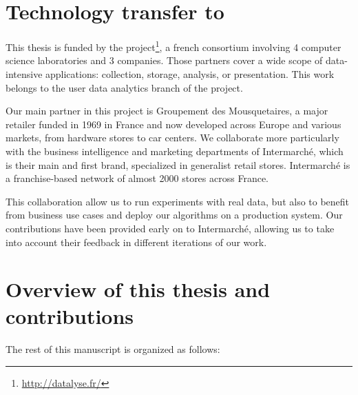 \section{Technology transfer to \datalyse}


This thesis is funded by the \datalyse project\footnote{\url{http://datalyse.fr/}},
a french consortium involving 4 computer science laboratories and 3 companies.
Those partners cover a wide scope of data-intensive applications:
collection, storage, analysis, or presentation.
This work belongs to the user data analytics branch of the project.

Our main partner in this project is Groupement des Mousquetaires,
a major retailer funded in 1969 in France and now developed across Europe and various markets,
from hardware stores to car centers.
We collaborate more particularly with the business intelligence and marketing
departments of Intermarch\'e,
which is their main and first brand,
specialized in generalist retail stores.
Intermarch\'e is a franchise-based network of almost 2000 stores across France.

This collaboration allow us to run experiments with real data,
but also to benefit from business use cases and deploy our algorithms on a production system.
Our contributions have been provided early on to Intermarch\'e,
allowing us to take into account their feedback in different iterations of our work.


\section{Overview of this thesis and contributions}

The rest of this manuscript is organized as follows:

